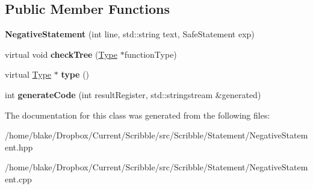 \subsection*{Public Member Functions}
\begin{DoxyCompactItemize}
\item 
\hypertarget{class_scribble_core_1_1_negative_statement_a07de206671ad926d91608e01bda11e0a}{{\bfseries Negative\-Statement} (int line, std\-::string text, Safe\-Statement exp)}\label{class_scribble_core_1_1_negative_statement_a07de206671ad926d91608e01bda11e0a}

\item 
\hypertarget{class_scribble_core_1_1_negative_statement_aa81869d3f1a8e5b7cd76e5d6cd66c101}{virtual void {\bfseries check\-Tree} (\hyperlink{class_scribble_core_1_1_type}{Type} $\ast$function\-Type)}\label{class_scribble_core_1_1_negative_statement_aa81869d3f1a8e5b7cd76e5d6cd66c101}

\item 
\hypertarget{class_scribble_core_1_1_negative_statement_af7365582aa7f33fd0324f59d1123abc6}{virtual \hyperlink{class_scribble_core_1_1_type}{Type} $\ast$ {\bfseries type} ()}\label{class_scribble_core_1_1_negative_statement_af7365582aa7f33fd0324f59d1123abc6}

\item 
\hypertarget{class_scribble_core_1_1_negative_statement_a69ba602bd56f3eb96c0842e082e0ce73}{int {\bfseries generate\-Code} (int result\-Register, std\-::stringstream \&generated)}\label{class_scribble_core_1_1_negative_statement_a69ba602bd56f3eb96c0842e082e0ce73}

\end{DoxyCompactItemize}


The documentation for this class was generated from the following files\-:\begin{DoxyCompactItemize}
\item 
/home/blake/\-Dropbox/\-Current/\-Scribble/src/\-Scribble/\-Statement/Negative\-Statement.\-hpp\item 
/home/blake/\-Dropbox/\-Current/\-Scribble/src/\-Scribble/\-Statement/Negative\-Statement.\-cpp\end{DoxyCompactItemize}
